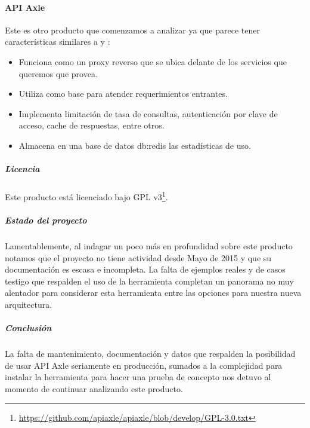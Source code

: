 \paragraph{API Axle}

Este es otro producto que comenzamos a analizar ya que parece tener características similares a  y :

\begin{itemize}
  \item Funciona como un proxy reverso que se ubica delante de los servicios que queremos que provea.
  \item Utiliza  como base para atender requerimientos entrantes.
  \item Implementa limitación de tasa de consultas, autenticación por clave de acceso, cache de respuestas, entre otros.
  \item Almacena en una base de datos \gls{db:redis} las estadísticas de uso.
\end{itemize}

\subparagraph{Licencia}

Este producto está licenciado bajo GPL v3\footnote{\url{https://github.com/apiaxle/apiaxle/blob/develop/GPL-3.0.txt}}.

\subparagraph{Estado del proyecto}

Lamentablemente, al indagar un poco más en profundidad sobre este producto notamos que el proyecto no tiene actividad desde Mayo de 2015 y que su documentación es escasa e incompleta. La falta de ejemplos reales y de casos testigo que respalden el uso de la herramienta completan un panorama no muy alentador para considerar esta herramienta entre las opciones para nuestra nueva arquitectura.

\subparagraph{Conclusión}

La falta de mantenimiento, documentación y datos que respalden la posibilidad de usar API Axle seriamente en producción, sumados a la complejidad para instalar la herramienta para hacer una prueba de concepto nos detuvo al momento de continuar analizando este producto.
